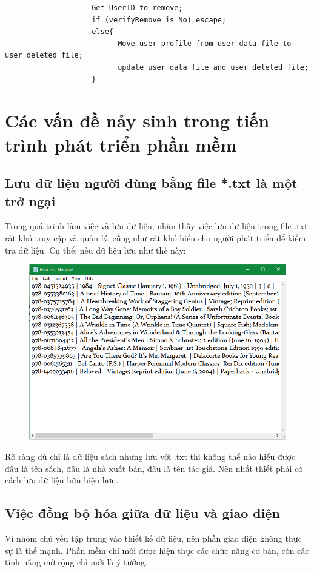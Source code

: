 \documentclass[12pt,a4paper]{report}
\begin{document}
				\begin{verbatim}
					Get UserID to remove;
					if (verifyRemove is No) escape;
					else{
						  Move user profile from user data file to user deleted file;
						  update user data file and user deleted file;
					}
				\end{verbatim}
\chapter{Các vấn đề nảy sinh trong tiến trình phát triển phần mềm}
	\section{Lưu dữ liệu người dùng bằng file *.txt là một trở ngại}
	Trong quá trình làm việc và lưu dữ liệu, nhận thấy việc lưu dữ liệu trong file .txt rất khó truy cập và quản lý, cũng như rất khó hiểu cho người phát triển để kiểm tra dữ liệu. Cụ thể: nếu dữ liệu lưu như thế này:
		\begin{figure}[H]
			\centering
			\label{F:booktext}
			\includegraphics[scale = .7]{booktext.png}
		\end{figure}
	Rõ ràng dù chỉ là dữ liệu sách nhưng lưu với .txt thì không thể nào hiểu được đâu là tên sách, đâu là nhà xuất bản, đâu là tên tác giả. Nên nhất thiết phải có cách lưu dữ liệu hữu hiệu hơn.\\
	\section{Việc đồng bộ hóa giữa dữ liệu và giao diện}
	Vì nhóm chủ yếu tập trung vào thiết kế dữ liệu, nên phần giao diện không thực sự là thế mạnh. Phần mềm chỉ mới được hiện thực các chức năng cơ bản, còn các tính năng mở rộng chỉ mới là ý tưởng.
\end{document}
